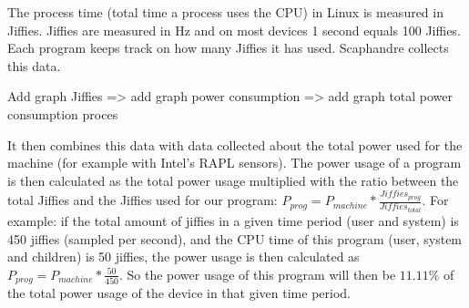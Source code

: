 \documentclass[../thesis.tex]{subfiles}
\begin{document}

The process time (total time a process uses the CPU) in Linux is measured in Jiffies. Jiffies are measured in Hz and on most devices 1 second equals 100 Jiffies. Each program keeps track on how many Jiffies it has used. Scaphandre collects this data.

\color{red} Add graph Jiffies => add graph power consumption => add graph total power consumption proces\color{black}

It then combines this data with data collected about the total power used for the machine (for example with Intel's RAPL sensors). The power usage of a program is then calculated as the total power usage multiplied with the ratio between the total Jiffies and the Jiffies used for our program: $ P_{prog} = P_{machine} * \frac{Jiffies_{prog}}{Jiffies_{total}}$. For example: if the total amount of jiffies in a given time period (user and system) is 450 jiffies (sampled per second), and the CPU time of this program (user, system and children) is 50 jiffies, the power usage is then calculated as $P_{prog} = P_{machine} * \frac{50}{450}$. So the power usage of this program will then be $11.11\%$ of the total power usage of the device in that given time period.








\end{document}

